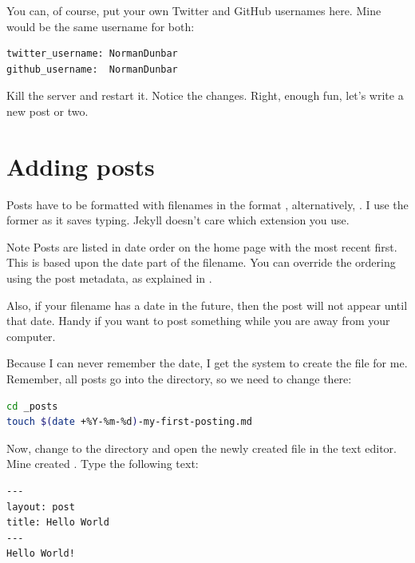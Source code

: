 You can, of course, put your own Twitter and GitHub usernames here. Mine would be the same username for both:

\begin{lstlisting}[caption={Configuring Twitter and GitHub links.},style=myText]
twitter_username: NormanDunbar
github_username:  NormanDunbar
\end{lstlisting}

Kill the server and restart it. Notice the changes. Right, enough fun, let's write a new  post or two.

\section{Adding posts}\label{sect: Adding Posts}

Posts have to be formatted with filenames in the format , alternatively,  . I use the former as it saves typing. Jekyll doesn't care which extension you use.

\begin{tips}{Note}
    Posts are listed in date order on the home page with the most recent first. This is based upon the date part of the filename. You can override the ordering using the post metadata, as explained in .

    Also, if your filename has a date in the future, then the post will not appear until that date. Handy if you want to post something while you are away from your computer.
\end{tips}

Because I can never remember the date, I get the system to create the file for me. Remember, all posts go into the  directory, so we need to change there:

\begin{lstlisting}[caption={Creating a new blog post.},style=myStyle, language=bash]
cd _posts
touch $(date +%Y-%m-%d)-my-first-posting.md
\end{lstlisting}

Now, change to the  directory and open the newly created file in the text editor. Mine created . Type the following text:

\begin{lstlisting}[caption={Creating a new blog post.},style=myText]
---
layout: post
title: Hello World
---
Hello World!
\end{lstlisting}

